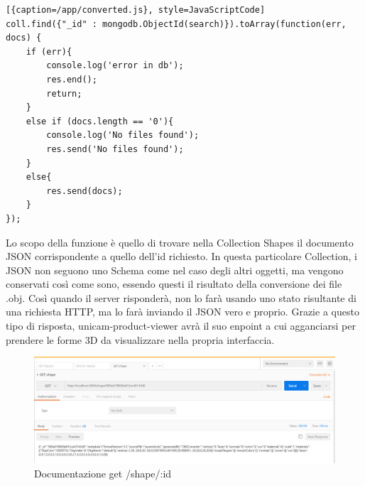 \begin{lstlisting}[{caption=/app/converted.js}, style=JavaScriptCode]
coll.find({"_id" : mongodb.ObjectId(search)}).toArray(function(err, docs) {
	if (err){
		console.log('error in db');
		res.end();
		return;
	}
	else if (docs.length == '0'){
		console.log('No files found');
		res.send('No files found');
	}
	else{
		res.send(docs);
	}
});
\end{lstlisting}
Lo scopo della funzione è quello di trovare nella Collection Shapes il documento JSON corrispondente a quello dell'id richiesto. In questa particolare Collection, i JSON non seguono uno Schema come nel caso degli altri oggetti, ma vengono conservati così come sono, essendo questi il risultato della conversione dei file .obj. Così quando il server risponderà, non lo farà usando uno stato risultante di una richiesta HTTP, ma lo farà inviando il JSON vero e proprio. Grazie a questo tipo di risposta, unicam-product-viewer avrà il suo enpoint a cui agganciarsi per prendere le forme 3D da visualizzare nella propria interfaccia.
\begin{figure}[h]
	\centering
	\includegraphics[scale=0.42]{Immagini/get_shape.png}
	\caption{Documentazione get /shape/:id}
\end{figure}
